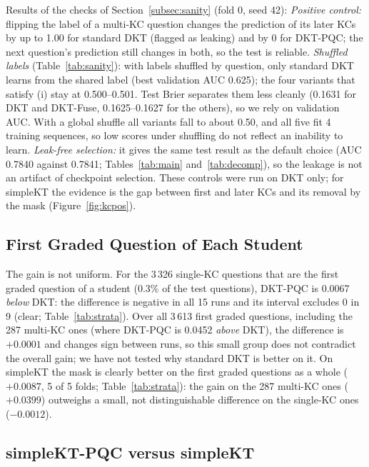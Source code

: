 Results of the checks of Section~\ref{subsec:sanity} (fold 0, seed 42):
\emph{Positive control:} flipping the label of a multi-KC question changes the prediction of its later KCs by up to 1.00 for standard DKT (flagged as leaking) and by 0 for DKT-PQC; the next question's prediction still changes in both, so the test is reliable.
\emph{Shuffled labels} (Table~\ref{tab:sanity}): with labels shuffled by question, only standard DKT learns from the shared label (best validation AUC 0.625); the four variants that satisfy (i) stay at 0.500--0.501. Test Brier separates them less cleanly (0.1631 for DKT and DKT-Fuse, 0.1625--0.1627 for the others), so we rely on validation AUC. With a global shuffle all variants fall to about 0.50, and all five fit 4 training sequences, so low scores under shuffling do not reflect an inability to learn.
\emph{Leak-free selection:} it gives the same test result as the default choice (AUC 0.7840 against 0.7841; Tables~\ref{tab:main} and~\ref{tab:decomp}), so the leakage is not an artifact of checkpoint selection.
These controls were run on DKT only; for simpleKT the evidence is the gap between first and later KCs and its removal by the mask (Figure~\ref{fig:kcpos}).

\subsection{First Graded Question of Each Student}
\label{subsec:res-first}

The gain is not uniform.
For the 3\,326 single-KC questions that are the first graded question of a student (0.3\% of the test questions), DKT-PQC is 0.0067 \emph{below} DKT: the difference is negative in all 15 runs and its interval excludes 0 in 9 (clear; Table~\ref{tab:strata}).
Over all 3\,613 first graded questions, including the 287 multi-KC ones (where DKT-PQC is 0.0452 \emph{above} DKT), the difference is $+0.0001$ and changes sign between runs, so this small group does not contradict the overall gain; we have not tested why standard DKT is better on it.
On simpleKT the mask is clearly better on the first graded questions as a whole ($+0.0087$, 5 of 5 folds; Table~\ref{tab:strata}): the gain on the 287 multi-KC ones ($+0.0399$) outweighs a small, not distinguishable difference on the single-KC ones ($-0.0012$).

\subsection{simpleKT-PQC versus simpleKT}
\label{subsec:res-skt}

